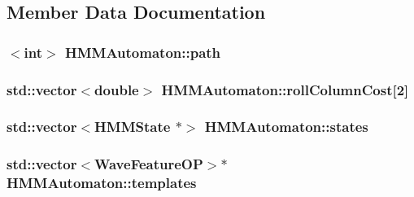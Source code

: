 \subsection{Member Data Documentation}
\hypertarget{class_h_m_m_automaton_a231123e55258281030977666a4f20eb2}{
\subsubsection[{path}]{$<$int$>$ H\+M\+M\+Automaton\+::path\hspace{0.3cm}{\ttfamily [protected]}}}\label{class_h_m_m_automaton_a231123e55258281030977666a4f20eb2}
\hypertarget{class_h_m_m_automaton_a17bbaefff43e3a67f6c3614b6ccdac9c}{
\subsubsection[{roll\+Column\+Cost}]{\setlength{\rightskip}{0pt plus 5cm}std\+::vector$<$double$>$ H\+M\+M\+Automaton\+::roll\+Column\+Cost\mbox{[}2\mbox{]}\hspace{0.3cm}{\ttfamily [protected]}}}\label{class_h_m_m_automaton_a17bbaefff43e3a67f6c3614b6ccdac9c}
\hypertarget{class_h_m_m_automaton_a3ffe1d6d2d66c2bcfefb1339140c513b}{
\subsubsection[{states}]{\setlength{\rightskip}{0pt plus 5cm}std\+::vector$<${\bf H\+M\+M\+State} $\ast$$>$ H\+M\+M\+Automaton\+::states\hspace{0.3cm}{\ttfamily [protected]}}}\label{class_h_m_m_automaton_a3ffe1d6d2d66c2bcfefb1339140c513b}
\hypertarget{class_h_m_m_automaton_a9932eb5aa8ff484ac2406f98498595cf}{
\subsubsection[{templates}]{\setlength{\rightskip}{0pt plus 5cm}std\+::vector$<${\bf Wave\+Feature\+O\+P}$>$$\ast$ H\+M\+M\+Automaton\+::templates\hspace{0.3cm}{\ttfamily [protected]}}}\label{class_h_m_m_automaton_a9932eb5aa8ff484ac2406f98498595cf}
